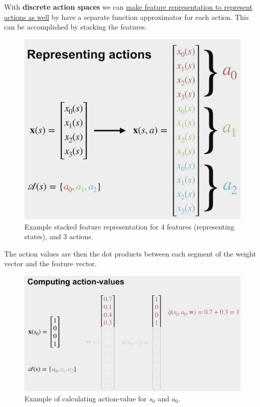 \documentclass[12pt, a4paper]{article}
\begin{document}
With \textbf{discrete action spaces} we can \uline{make feature representation to represent actions as well} by have a separate function approximator for each action. This can be accomplished by stacking the features.

\begin{figure}[H]
  \centering
    \includegraphics[width=0.8\columnwidth]{images/stacked-feature-representation-eg.png}
    \caption{Example stacked feature representation for 4 features (representing states), and 3 actions.}
    \label{fig:stacked-feature-representation-eg}
\end{figure}

The action values are then the dot products between each segment of the weight vector and the feature vector.

\begin{figure}[H]
  \centering
    \includegraphics[width=0.9\columnwidth]{images/stacked-feature-representation-eg2.png}
    \caption{Example of calculating action-value for $s_0$ and $a_0$.}
    \label{fig:stacked-feature-representation-eg2}
\end{figure}
\end{document}
